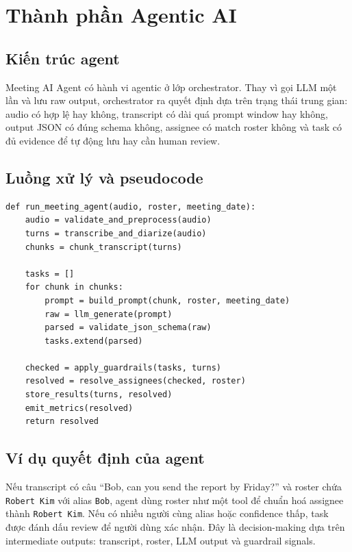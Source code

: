 \chapter{Thành phần Agentic AI}

\section{Kiến trúc agent}

Meeting AI Agent có hành vi agentic ở lớp orchestrator. Thay vì gọi LLM một lần và lưu raw output, orchestrator ra quyết định dựa trên trạng thái trung gian: audio có hợp lệ hay không, transcript có dài quá prompt window hay không, output JSON có đúng schema không, assignee có match roster không và task có đủ evidence để tự động lưu hay cần human review.

\section{Luồng xử lý và pseudocode}

\begin{lstlisting}[language=Python3,caption={Luồng xử lý agentic}]
def run_meeting_agent(audio, roster, meeting_date):
    audio = validate_and_preprocess(audio)
    turns = transcribe_and_diarize(audio)
    chunks = chunk_transcript(turns)

    tasks = []
    for chunk in chunks:
        prompt = build_prompt(chunk, roster, meeting_date)
        raw = llm_generate(prompt)
        parsed = validate_json_schema(raw)
        tasks.extend(parsed)

    checked = apply_guardrails(tasks, turns)
    resolved = resolve_assignees(checked, roster)
    store_results(turns, resolved)
    emit_metrics(resolved)
    return resolved
\end{lstlisting}

\section{Ví dụ quyết định của agent}

Nếu transcript có câu ``Bob, can you send the report by Friday?'' và roster chứa \texttt{Robert Kim} với alias \texttt{Bob}, agent dùng roster như một tool để chuẩn hoá assignee thành \texttt{Robert Kim}. Nếu có nhiều người cùng alias hoặc confidence thấp, task được đánh dấu review để người dùng xác nhận. Đây là decision-making dựa trên intermediate outputs: transcript, roster, LLM output và guardrail signals.

